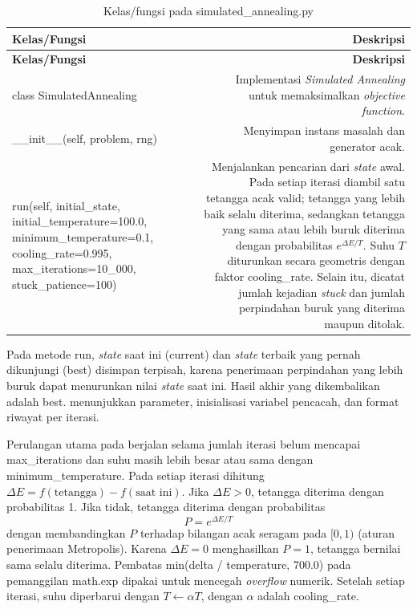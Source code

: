 \begin{longtable}{|K|D|}
\caption{Kelas/fungsi pada simulated\_annealing.py}
\label{tab:sa} \\
\hline
\textbf{Kelas/Fungsi} & \textbf{Deskripsi} \\
\hline
\endfirsthead
\hline
\textbf{Kelas/Fungsi} & \textbf{Deskripsi} \\
\hline
\endhead
\hline
\endlastfoot
class SimulatedAnnealing & Implementasi \textit{Simulated Annealing} untuk memaksimalkan \textit{objective function}. \\ \hline
\_\_init\_\_(self, problem, rng) & Menyimpan instans masalah dan generator acak. \\ \hline
run(self, initial\_state, initial\_temperature=100.0, minimum\_temperature=0.1, cooling\_rate=0.995, max\_iterations=10\_000, stuck\_patience=100) & Menjalankan pencarian dari \textit{state} awal. Pada setiap iterasi diambil satu tetangga acak valid; tetangga yang lebih baik selalu diterima, sedangkan tetangga yang sama atau lebih buruk diterima dengan probabilitas $e^{\Delta E / T}$. Suhu $T$ diturunkan secara geometris dengan faktor cooling\_rate. Selain itu, dicatat jumlah kejadian \textit{stuck} dan jumlah perpindahan buruk yang diterima maupun ditolak. \\ \hline
\end{longtable}

Pada metode run, \textit{state} saat ini (current) dan \textit{state} terbaik yang pernah dikunjungi (best) disimpan terpisah, karena penerimaan perpindahan yang lebih buruk dapat menurunkan nilai \textit{state} saat ini. Hasil akhir yang dikembalikan adalah best.  menunjukkan parameter, inisialisasi variabel pencacah, dan format riwayat per iterasi.


Perulangan utama pada  berjalan selama jumlah iterasi belum mencapai max\_iterations dan suhu masih lebih besar atau sama dengan minimum\_temperature. Pada setiap iterasi dihitung $\Delta E = f(\text{tetangga}) - f(\text{saat ini})$. Jika $\Delta E > 0$, tetangga diterima dengan probabilitas 1. Jika tidak, tetangga diterima dengan probabilitas
\begin{equation}
P = e^{\Delta E / T}
\end{equation}
dengan membandingkan $P$ terhadap bilangan acak seragam pada $[0, 1)$ (aturan penerimaan Metropolis). Karena $\Delta E = 0$ menghasilkan $P = 1$, tetangga bernilai sama selalu diterima. Pembatas min(delta / temperature, 700.0) pada pemanggilan math.exp dipakai untuk mencegah \textit{overflow} numerik. Setelah setiap iterasi, suhu diperbarui dengan $T \leftarrow \alpha T$, dengan $\alpha$ adalah cooling\_rate.

